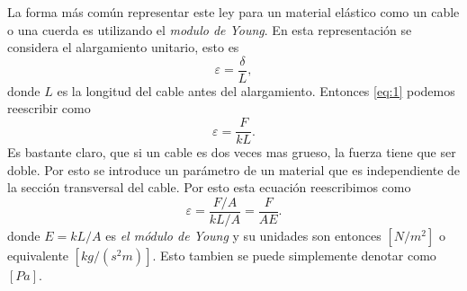 La forma más común representar este ley para un material elástico como
un cable o una cuerda es utilizando el \emph{modulo de Young}. En esta
representación se considera el alargamiento unitario, esto es
\begin{displaymath}
 \varepsilon = \frac{\delta}{L},
\end{displaymath}
donde $L$ es la longitud del cable antes del alargamiento. Entonces
\eqref{eq:1} podemos reescribir como
\begin{displaymath}
 \varepsilon = \frac{F}{kL}.
\end{displaymath}
Es bastante claro, que si un cable es dos veces mas grueso, la fuerza
tiene que ser doble. Por esto se introduce un parámetro de un material
que es independiente de la sección transversal del cable. Por esto
esta ecuación reescribimos como
\begin{displaymath}
 \varepsilon = \frac{F/A}{kL/A}=\frac{F}{AE}.
\end{displaymath}
donde $E=kL/A$ es \emph{el módulo de Young} y su unidades son entonces
$[N/m^2]$ o equivalente $[kg/(s^2m)]$. Esto tambien se puede
simplemente denotar como $[Pa]$. 


